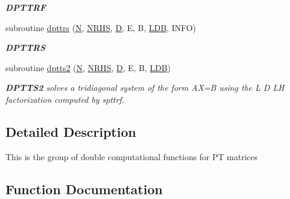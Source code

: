 \begin{DoxyCompactItemize}
\begin{DoxyCompactList}\small\item\em {\bfseries D\+P\+T\+T\+R\+F} \end{DoxyCompactList}\item 
subroutine \hyperlink{group__doublePTcomputational_gaf3cb531de6ceb79732d438ad3b66132a}{dpttrs} (\hyperlink{polmisc_8c_a0240ac851181b84ac374872dc5434ee4}{N}, \hyperlink{example__user_8c_aa0138da002ce2a90360df2f521eb3198}{N\+R\+H\+S}, \hyperlink{odrpack_8h_a7dae6ea403d00f3687f24a874e67d139}{D}, E, B, \hyperlink{example__user_8c_a50e90a7104df172b5a89a06c47fcca04}{L\+D\+B}, I\+N\+F\+O)
\begin{DoxyCompactList}\small\item\em {\bfseries D\+P\+T\+T\+R\+S} \end{DoxyCompactList}\item 
subroutine \hyperlink{group__doublePTcomputational_gaf85ae9b8724a8f9b25e67da33ba5ab99}{dptts2} (\hyperlink{polmisc_8c_a0240ac851181b84ac374872dc5434ee4}{N}, \hyperlink{example__user_8c_aa0138da002ce2a90360df2f521eb3198}{N\+R\+H\+S}, \hyperlink{odrpack_8h_a7dae6ea403d00f3687f24a874e67d139}{D}, E, B, \hyperlink{example__user_8c_a50e90a7104df172b5a89a06c47fcca04}{L\+D\+B})
\begin{DoxyCompactList}\small\item\em {\bfseries D\+P\+T\+T\+S2} solves a tridiagonal system of the form A\+X=B using the L D L\+H factorization computed by spttrf. \end{DoxyCompactList}\end{DoxyCompactItemize}


\subsection{Detailed Description}
This is the group of double computational functions for P\+T matrices 

\subsection{Function Documentation}
\hypertarget{group__doublePTcomputational_ga97c36939111e6f008b6d9bd731854355}{}
